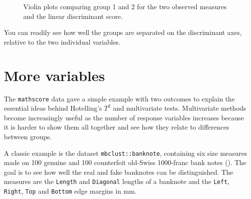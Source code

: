 \documentclass[
  letterpaper,
  10pt,
  krantz2]{krantz}
\begin{document}
\begin{figure}[H]


\caption{\label{fig-mathscore-violins}Violin plots comparing group 1 and
2 for the two observed measures and the linear discriminant score.}

\end{figure}%

You can readily see how well the groups are separated on the
discriminant axes, relative to the two individual variables.

\section{More variables}\label{more-variables}

The \texttt{mathscore} data gave a simple example with two outcomes to
explain the essential ideas behind Hotelling's \(T^2\) and multivariate
tests. Multivariate methods become increasingly useful as the number of
response variables increases because it is harder to show them all
together and see how they relate to differences between groups.

A classic example is the dataset \texttt{mbclust::banknote}, containing
six size measures made on 100 genuine and 100 counterfeit old-Swiss
1000-franc bank notes (). The goal is to see how well the real and fake banknotes
can be distinguished. The measures are the \texttt{Length} and
\texttt{Diagonal} lengths of a banknote and the \texttt{Left},
\texttt{Right}, \texttt{Top} and \texttt{Bottom} edge margins in mm.
\end{document}
